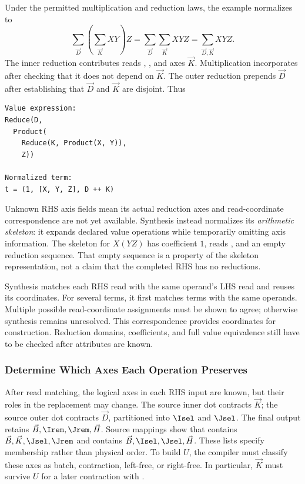 Under the permitted multiplication and reduction laws, the example normalizes
to
\begin{equation}
 \sum_{\vec D}\left(\sum_{\vec K} XY\right)Z
 =\sum_{\vec D}\sum_{\vec K} XYZ
 =\sum_{\vec D,\vec K}XYZ.
\end{equation}
The inner reduction contributes reads , , and axes $\vec K$.
Multiplication incorporates  after checking that it does not depend
on $\vec K$. The outer reduction prepends $\vec D$ after establishing that $\vec D$ and $\vec K$
are disjoint. Thus
\begin{lstlisting}
Value expression:
Reduce(D,
  Product(
    Reduce(K, Product(X, Y)),
    Z))

Normalized term:
t = (1, [X, Y, Z], D ++ K)
\end{lstlisting}

Unknown RHS axis fields mean its actual reduction axes and read-coordinate correspondence
are not yet available. Synthesis instead normalizes its \emph{arithmetic
skeleton}: it expands declared value operations while temporarily omitting
axis information. The skeleton for $X(YZ)$ has coefficient $1$, reads
\code{[X,Y,Z]}, and an empty reduction sequence. That empty sequence is a
property of the skeleton representation, not a claim that the completed RHS
has no reductions.

Synthesis matches each RHS read with the same operand's LHS read and reuses
its coordinates. For several terms, it first matches terms with the same
operands. Multiple possible read-coordinate assignments must be shown to
agree; otherwise synthesis remains unresolved. This correspondence provides
coordinates for construction. Reduction domains, coefficients, and full
value equivalence still have to be checked after attributes are known.


\subsubsection{Determine Which Axes Each Operation Preserves}
\label{extended:sec:keep-axes}


After read matching, the logical axes in each RHS input are known, but their
roles in the replacement may change. The source inner dot contracts $\vec K$;
the source outer dot contracts $\vec D$, partitioned into $\Isel$ and $\Jsel$.
The final output retains $\vec B,\Irem,\Jrem,\vec H$. Source mappings show that
 contains $\vec B,\vec K,\Jsel,\Jrem$ and  contains
$\vec B,\Isel,\Jsel,\vec H$. These lists specify membership rather than physical order.
To build $U$, the compiler must classify these axes as batch, contraction,
left-free, or right-free. In particular, $\vec K$ must survive $U$ for a later
contraction with .

